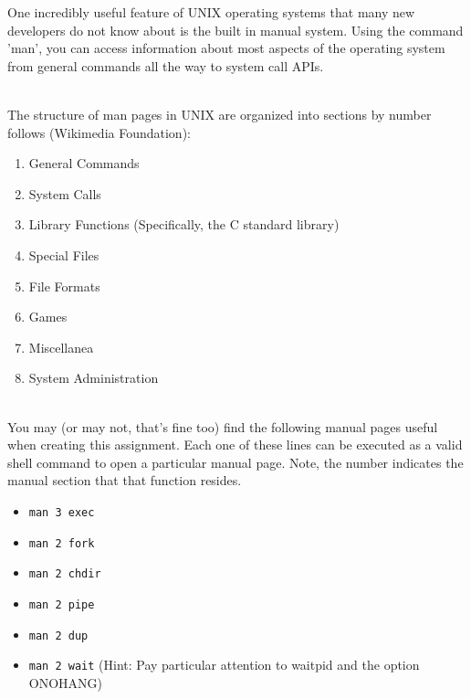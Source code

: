 \documentclass[12pt]{extarticle}
\newenvironment{myindentpar}[1]%
 {\begin{list}{}%
         {\setlength{\leftmargin}{#1}}%
         \item[]%
 }
 {\end{list}}
\newcommand{\code}[1]{\colorbox{codegray}{\texttt{#1}}}
\begin{document}
\begin{myindentpar}{5mm}

    One incredibly useful feature of UNIX operating systems that many new developers do not know about is the built in manual system.  Using the command 'man', you can access information about most aspects of the operating system from general commands all the way to system call APIs.  
    
    \ \\
    The structure of man pages in UNIX are organized into sections by number follows (Wikimedia Foundation):
    \begin{enumerate}
        \setlength\itemsep{-0.1em}
        
        \item General Commands
        \item System Calls
        \item Library Functions (Specifically, the C standard library)
        \item Special Files
        \item File Formats
        \item Games
        \item Miscellanea
        \item System Administration
        
    \end{enumerate}
    
    \ \\
    You may (or may not, that's fine too) find the following manual pages useful when creating this assignment.  Each one of these lines can be executed as a valid shell command to open a particular manual page.  Note, the number indicates the manual section that that function resides.  
    
    \begin{itemize}
        \setlength\itemsep{-0.1em}
    
        \item \code{man 3 exec}
        \item \code{man 2 fork}
        \item \code{man 2 chdir}
        \item \code{man 2 pipe}
        \item \code{man 2 dup}
        \item \code{man 2 wait} (Hint: Pay particular attention to waitpid and the option ONOHANG)
     
    \end{itemize}

\end{myindentpar}
\end{document}
